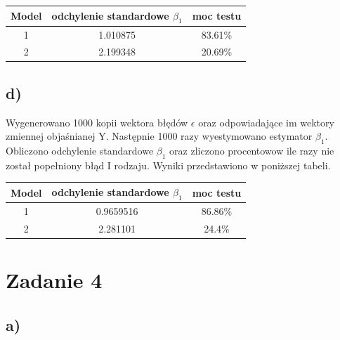 \documentclass[9pt]{article}  %
\begin{document}
    
  \begin{table}[H]
  \centering
    \begin{tabular}{c|c|c}
     Model & odchylenie standardowe $\beta_1$ & moc testu \\
         \hline
     1 & 1.010875 & 83.61\% \\
     2 & 2.199348 & 20.69\% \\
  \end{tabular} 
  \end{table}
  
  
  

  \subsection{d)}
  
  Wygenerowano 1000 kopii wektora błędów $\epsilon$ oraz odpowiadające im wektory zmiennej objaśnianej Y. Następnie 1000 razy wyestymowano estymator $\beta_1$. Obliczono odchylenie standardowe $\beta_1$ oraz zliczono procentowow ile razy nie został popełniony błąd I rodzaju. Wyniki przedstawiono w poniższej tabeli. 
  
  \begin{table}[H]
  \centering
    \begin{tabular}{c|c|c}
     Model & odchylenie standardowe $\beta_1$ & moc testu \\
         \hline
     1 & 0.9659516 & 86.86\% \\
     2 & 2.281101 & 24.4\% \\
  \end{tabular} 
  \end{table}


\section{Zadanie 4}

  \subsection{a)}
  
\end{document}
